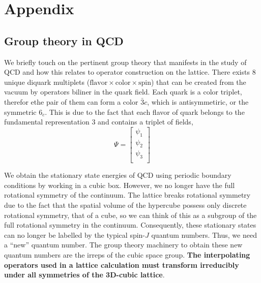 \chapter{Appendix}
\label{sec:app}
\section{Group theory in QCD}
We briefly touch on the pertinent group theory that manifests in the study of QCD and how this relates to operator construction on the lattice. 
There exists 8 unique diquark multiplets ($\text{flavor} \times \text{color} \times \text{spin}$) that can be created from the vacuum by operators biliner in the quark field. Each quark is a color triplet, therefor ethe pair of them can form a color $\bar{3}c$, which is antisymmetiric, or the symmetric $6_c$. This is due to the fact that each flavor of quark belongs to the fundamental representation $3$ and contains a triplet of fields, 
\begin{equation}
    \Psi = \begin{bmatrix}
        \psi_1 \\
        \psi_2 \\
        \psi_3 \\ 
    \end{bmatrix}
\end{equation}

We obtain the stationary state energies of QCD using periodic boundary conditions by working in a cubic box. However, we no longer have the full rotational symmetry of the continuum. The lattice breaks rotational symmetry due to the fact that the spatial volume of the hypercube possess only discrete rotational symmetry, that of a cube, so we can think of this as a subgroup of the full rotational symmetry in the continuum. Consequently, these stationary states can no longer be labelled by the typical spin-$J$ quantum numbers. Thus, we need a ``new'' quantum number. The group theory machinery to obtain these new quantum numbers are the irreps of the cubic space group. \textbf{The interpolating operators used in a lattice calculation must transform irreducibly under all symmetries of the 3D-cubic lattice}. 

